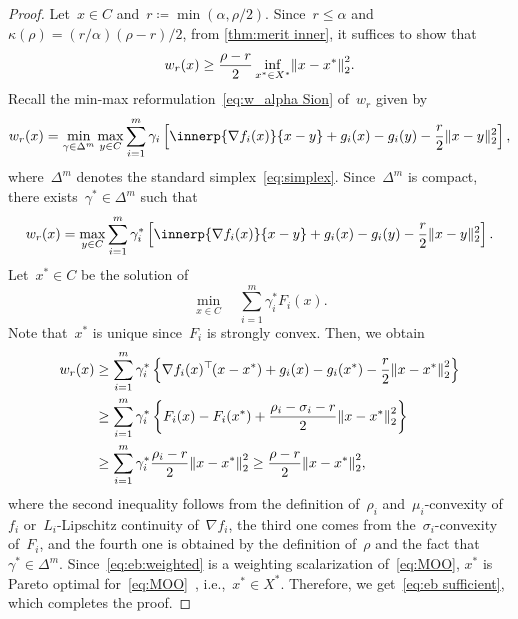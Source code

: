 \documentclass[../main]{subfiles}
\begin{document}
\begin{proof}
    Let~$x \in C$ and~$r \coloneqq \min ( \alpha, \rho / 2 )$.
    Since~$r \le \alpha$ and~$\kappa(\rho) = (r / \alpha) (\rho - r) / 2$, from \cref{thm:merit inner}, it suffices to show that
    \begin{equation} \label{eq:eb sufficient}
        w_r(x) \ge \frac{\rho - r}{2} \inf_{x^\ast \in X^\ast} \norm*{x - x^\ast}_2^2
    .\end{equation} 
    Recall the min-max reformulation~\cref{eq:w_alpha Sion} of~$w_r$ given by
    \[
        w_r(x) = \min_{\gamma \in \Delta^m} \max_{y \in C} \sum_{i = 1}^m \gamma_i \left[ \innerp{\nabla f_i(x)}{x - y} + g_i(x) - g_i(y) - \frac{r}{2} \norm{x - y}_2^2 \right]
    ,\]
    where~$\Delta^m$ denotes the standard simplex~\cref{eq:simplex}.
    Since~$\Delta^m$ is compact, there exists~$\gamma^\ast \in \Delta^m$ such that
    \[
        w_r(x) = \max_{y \in C} \sum_{i = 1}^m \gamma_i^\ast \left[ \innerp{\nabla f_i(x)}{x - y} + g_i(x) - g_i(y) - \frac{r}{2} \norm{x - y}_2^2 \right].
    \]
    Let~$x^\ast \in C$ be the solution of
    \begin{equation} \label{eq:eb:weighted}
        \min_{x \in C} \quad \sum_{i = 1}^m \gamma_i^\ast F_i(x)
    .\end{equation}
    Note that~$x^\ast$ is unique since~$F_i$ is strongly convex.
    Then, we obtain
    \begin{align}
        w_r(x) &\ge \sum_{i = 1}^m \gamma_i^\ast \left\{ \nabla f_i(x)^\T (x - x^\ast) + g_i(x) - g_i(x^\ast) - \frac{r}{2} \norm*{x - x^\ast}_2^2 \right\} \\
               &\ge \sum_{i = 1}^m \gamma_i^\ast \left\{ F_i(x) - F_i(x^\ast) + \frac{\rho_i - \sigma_i - r}{2} \norm*{x - x^\ast}_2^2 \right\} \\
               &\ge \sum_{i = 1}^m \gamma_i^\ast \frac{\rho_i - r}{2} \norm*{x - x^\ast}_2^2 \ge \frac{\rho - r}{2} \norm*{x - x^\ast}_2^2
    ,\end{align}
    where the second inequality follows from the definition of~$\rho_i$ and~$\mu_i$-convexity of~$f_i$ or~$L_i$-Lipschitz continuity of~$\nabla f_i$, the third one comes from the~$\sigma_i$-convexity of~$F_i$, and the fourth one is obtained by the definition of~$\rho$ and the fact that~$\gamma^\ast \in \Delta^m$.
    Since~\cref{eq:eb:weighted} is a weighting scalarization of~\cref{eq:MOO}, $x^\ast$ is Pareto optimal for~\cref{eq:MOO}~\cite[Theorem 3.1.3]{Miettinen1998}, i.e.,~$x^\ast \in X^\ast$.
    Therefore, we get~\cref{eq:eb sufficient}, which completes the proof.
\end{proof}
\end{document}
